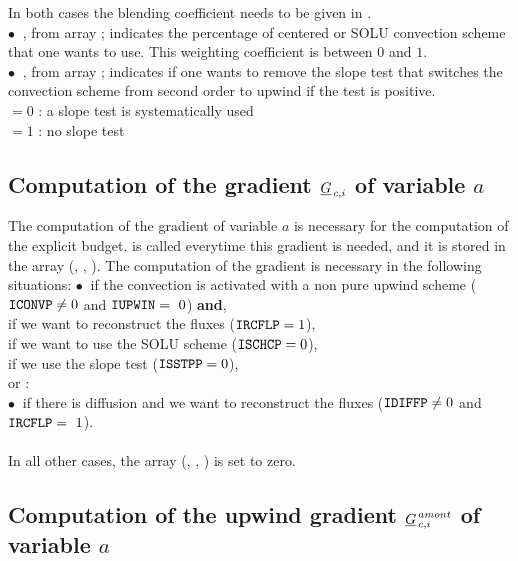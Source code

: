 In both cases the blending coefficient  needs to be given in .\\
$\bullet \ $ , from array  ; indicates the percentage of centered or SOLU convection scheme that one wants to use. This weighting coefficient is between $0$ and $1$.\\
$\bullet \ $ , from array  ; indicates if one wants to remove the slope test that switches the convection scheme from second order to upwind if the test is positive.\\
\hspace*{1cm}$ = 0$ : a slope test is systematically used\\
\hspace*{1cm}$ = 1$ : no slope test
\subsection*{\bf Computation of the gradient $\underline{G}_{\,c,i}$ of variable $a$}
The computation of the gradient of variable $a$ is necessary for the computation of the explicit budget.    is called everytime this gradient is needed, and it is stored in the array (, , ). The computation of the gradient is necessary in the following situations:
\hspace*{0.5cm}$\bullet \ $ if the convection is activated with a non pure upwind scheme
 ($\text{\texttt{ICONVP}} \ne {0}$ and $\text{\texttt{IUPWIN}} =~0$) {\bf and},\\
\hspace*{1cm} if we want to reconstruct the fluxes  ($\text{\texttt{IRCFLP}} = {1}$),\\
\hspace*{1cm}{\bf or} if we want to use the SOLU scheme
($\text{\texttt{ISCHCP}} = {0}$),\\
\hspace*{1cm}{\bf or} if we use the slope test ($\text{\texttt{ISSTPP}} = {0}$),\\
or :\\
\hspace*{0.5cm}$\bullet \ $ if there is diffusion and we want to reconstruct the fluxes ($\text{\texttt{IDIFFP}} \ne {0}$ and $\text{\texttt{IRCFLP}} =~1$).\\\\
In all other cases, the array (, , ) is set to zero.

\subsection*{\bf Computation of the upwind gradient $\underline{G}^{\,amont}_{\,c,i}$ of variable $a$}

